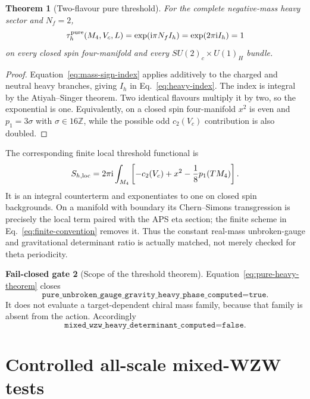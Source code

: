 \documentclass[11pt]{article}
\newtheorem{theorem}{Theorem}[section]
\theoremstyle{definition}
\newtheorem{gate}[theorem]{Fail-closed gate}
\theoremstyle{remark}
\newcommand{\ii}{\mathrm i}
\newcommand{\ZZ}{\mathbb Z}
\begin{document}
\begin{theorem}[Two-flavour pure threshold]
For the complete negative-mass heavy sector and \(N_f=2\),
\begin{equation}
 \tau_h^{\rm pure}(M_4,V_c,L)
 =\exp\!\left(\ii\pi N_f I_h\right)
 =\exp(2\pi\ii I_h)=1
 \label{eq:pure-heavy-theorem}
\end{equation}
on every closed spin four-manifold and every
\(SU(2)_c\times U(1)_H\) bundle.
\end{theorem}
\begin{proof}
Equation~\eqref{eq:mass-sign-index} applies additively to the charged and
neutral heavy branches, giving \(I_h\) in Eq.~\eqref{eq:heavy-index}.
The index is integral by the Atiyah--Singer theorem.  Two identical flavours
multiply it by two, so the exponential is one.  Equivalently, on a closed
spin four-manifold \(x^2\) is even and \(p_1=3\sigma\) with
\(\sigma\in16\ZZ\), while the possible odd \(c_2(V_c)\) contribution is
also doubled.
\end{proof}

The corresponding finite local threshold functional is
\begin{equation}
 S_{h,\rm loc}
 =2\pi\ii\int_{M_4}
 \left[-c_2(V_c)+x^2-\frac18p_1(TM_4)\right].
 \label{eq:local-threshold}
\end{equation}
It is an integral counterterm and exponentiates to one on closed spin
backgrounds.  On a manifold with boundary its Chern--Simons transgression
is precisely the local term paired with the APS eta section; the finite
scheme in Eq.~\eqref{eq:finite-convention} removes it.  Thus the constant
real-mass unbroken-gauge and gravitational determinant ratio is actually
matched, not merely checked for theta periodicity.

\begin{gate}[Scope of the threshold theorem]
Equation~\eqref{eq:pure-heavy-theorem} closes
\begin{equation}
 \texttt{pure\_unbroken\_gauge\_gravity\_heavy\_phase\_computed=true}.
 \label{eq:pure-threshold-true}
\end{equation}
It does not evaluate a target-dependent chiral mass family, because that
family is absent from the action.  Accordingly
\begin{equation}
 \texttt{mixed\_wzw\_heavy\_determinant\_computed=false}.
 \label{eq:mixed-threshold-false}
\end{equation}
\end{gate}

\section{Controlled all-scale mixed-WZW tests}
\end{document}
